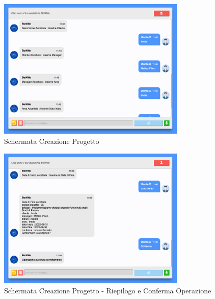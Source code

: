 \begin{figure}[H]
    \centering\includegraphics[width=0.8\textwidth, height=0.7\textheight, keepaspectratio]{images/schermata_creazione_progetto_2.png}
    \caption{Schermata Creazione Progetto}
\end{figure}

\begin{figure}[H]
    \centering\includegraphics[width=0.8\textwidth, height=0.7\textheight, keepaspectratio]{images/schermata_creazione_progetto_3.png}
    \caption{Schermata Creazione Progetto - Riepilogo e Conferma Operazione}
\end{figure}